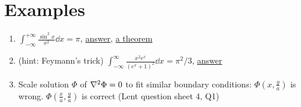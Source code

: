 \documentclass{article}
\theoremstyle{remark}
\theoremstyle{remark}
\begin{document}
    \section*{Examples}
    \begin{enumerate}
        \item $\int_{-\infty}^{+\infty}\frac{\sin^2x}{x^2}\dd x=\pi$, \href{https://math.stackexchange.com/questions/141695/how-to-calculate-the-integral-of-sin2x-x2}{answer}, \href{https://en.wikipedia.org/wiki/Lobachevsky_integral_formula}{a theorem}
        \item (hint: Feymann's trick) $\int_{-\infty}^{\infty}\frac{x^2e^x}{(e^x+1)^2}\dd x=\pi^2/3$, \href{https://math.stackexchange.com/questions/1801106/how-does-one-integrate-x2-fracexex12}{answer}
        \item Scale solution $\Phi$ of $\laplacian{\Phi}=0$ to fit similar boundary conditions: $\Phi\left(x,\frac{y}{a}\right)$ is wrong. $\Phi\left(\frac{x}{a},\frac{y}{a}\right)$ is correct (Lent question sheet 4, Q1)
    \end{enumerate}
\end{document}
